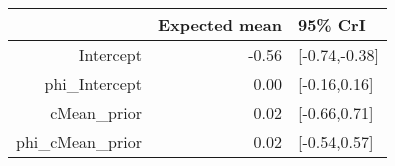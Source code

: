 \begin{tabular}{rrl}
  \hline
 & Expected mean & 95\% CrI \\ 
  \hline
Intercept & -0.56 & [-0.74,-0.38] \\ 
  phi\_Intercept & 0.00 & [-0.16,0.16] \\ 
  cMean\_prior & 0.02 & [-0.66,0.71] \\ 
  phi\_cMean\_prior & 0.02 & [-0.54,0.57] \\ 
   \hline
\end{tabular}

